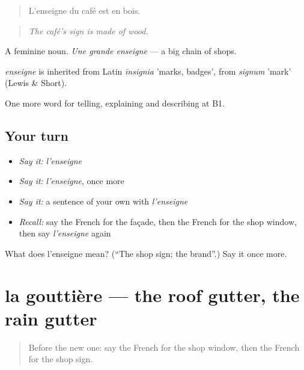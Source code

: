 \begin{quote}
L'enseigne du café est en bois.
\end{quote}

\begin{quote}
\emph{The café's sign is made of wood.}
\end{quote}

A feminine noun. \emph{Une grande enseigne} — a big chain of shops.

\begin{cousinweb}
\emph{enseigne} is inherited from Latin \emph{īnsignia} 'marks, badges', from \emph{signum} 'mark' (Lewis \& Short).
\end{cousinweb}

\begin{grammarlens}[title={What you've built}]
One more word for telling, explaining and describing at B1.
\end{grammarlens}

\subsection*{Your turn}
\begin{itemize}
\raggedright
  \item \emph{Say it:} \emph{l'enseigne}
  \item \emph{Say it:} \emph{l'enseigne}, once more
  \item \emph{Say it:} a sentence of your own with \emph{l'enseigne}
  \item \emph{Recall:} say the French for the façade, then the French for the shop window, then say \emph{l'enseigne} again
\end{itemize}

\begin{tcolorbox}[breakable,colback=teal!4,colframe=teal!35!black,title={Before you move on}]
What does l'enseigne mean? (\textquotedblleft{}The shop sign; the brand\textquotedblright{}.) Say it once more.
\end{tcolorbox}
\section[la gouttière]{la gouttière — the roof gutter, the rain gutter}

\label{lesson:FR-C442-gouttiere}



\begin{quote}
Before the new one: say the French for the shop window, then the French for the shop sign.
\end{quote}

